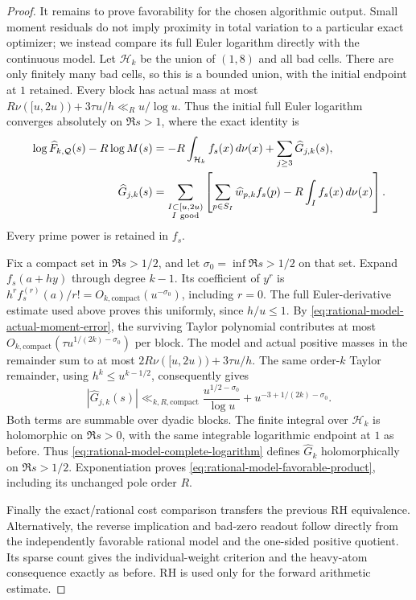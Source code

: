 \documentclass[11pt]{article}
\theoremstyle{definition}
\begin{document}
\begin{proof}
It remains to prove favorability for the chosen algorithmic
output. Small moment residuals do not imply proximity in
total variation to a particular exact optimizer; we instead
compare its full Euler logarithm directly with the continuous
model. Let $\mathcal H_k$ be the union of $(1,8)$ and all bad
cells. There are only finitely many bad cells, so this is
a bounded union, with the initial endpoint at $1$ retained.
Every block has actual mass at most
$R\nu([u,2u))+3\tau u/h\ll_Ru/\log u$.
Thus the initial full Euler logarithm converges absolutely
on $\Re s>1$, where the exact identity is
\begin{equation}
 \begin{aligned}
 \log\widehat F_{k,\mathcal Q}(s)-R\log M(s)
 &=-R\int_{\mathcal H_k}f_s(x)\,d\nu(x)
                         +\sum_{j\ge3}\widehat G_{j,k}(s),\\
 \widehat G_{j,k}(s)
 &=\sum_{\substack{I\subset[u,2u)\\I\ {\rm good}}}
       \left[\sum_{p\in S_I}\widehat w_{p,k}f_s(p)
                              -R\int_I f_s(x)\,d\nu(x)\right].
 \end{aligned}
 \label{eq:rational-model-complete-logarithm}
\end{equation}
Every prime power is retained in $f_s$.

Fix a compact set in $\Re s>1/2$, and let
$\sigma_0=\inf\Re s>1/2$ on that set.
Expand $f_s(a+hy)$ through degree $k-1$.
Its coefficient of $y^r$ is
$h^r f_s^{(r)}(a)/r!=O_{k,\mathrm{compact}}(u^{-\sigma_0})$,
including $r=0$. The full Euler-derivative estimate used
above proves this uniformly, since $h/u\le1$.
By \eqref{eq:rational-model-actual-moment-error}, the surviving
Taylor polynomial contributes at most
$O_{k,\mathrm{compact}}(\tau u^{1/(2k)-\sigma_0})$ per block.
The model and actual positive masses in the remainder
sum to at most $2R\nu([u,2u))+3\tau u/h$.
The same order-$k$ Taylor remainder, using
$h^k\le u^{k-1/2}$, consequently gives
\begin{equation}
 |\widehat G_{j,k}(s)|\ll_{k,R,\mathrm{compact}}
       \frac{u^{1/2-\sigma_0}}{\log u}
                         +u^{-3+1/(2k)-\sigma_0}.
 \label{eq:rational-model-summable-error}
\end{equation}
Both terms are summable over dyadic blocks.
The finite integral over $\mathcal H_k$ is holomorphic on
$\Re s>0$, with the same integrable logarithmic endpoint
at $1$ as before.
Thus \eqref{eq:rational-model-complete-logarithm} defines
$\widehat G_k$ holomorphically on $\Re s>1/2$.
Exponentiation proves
\eqref{eq:rational-model-favorable-product}, including its
unchanged pole order $R$.

Finally the exact/rational cost comparison transfers the
previous RH equivalence. Alternatively, the reverse implication
and bad-zero readout follow directly from the independently
favorable rational model and the one-sided positive quotient.
Its sparse count gives the individual-weight criterion and
the heavy-atom consequence exactly as before.
RH is used only for the forward arithmetic estimate.
\end{proof}
\end{document}

